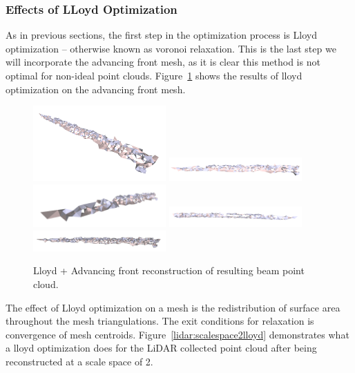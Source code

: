 \documentclass[12pt]{drexelthesis}
\let\Oldsubsubsection\subsubsection
\renewcommand{\subsubsection}{\FloatBarrier\Oldsubsubsection}
\begin{document}
\subsubsection{Effects of LLoyd Optimization}

As in previous sections, the first step in the optimization process is Lloyd optimization -- otherwise known as voronoi relaxation. This is the last step we will incorporate the advancing front mesh, as it is clear this method is not optimal for non-ideal point clouds. Figure~\ref{lidar:advancefrontlloyd} shows the results of lloyd optimization on the advancing front mesh.

\begin{figure}[!ht]
	\centering
		\includegraphics[width=2in]{real-lab-scans/meshed/optimized/advancedlloyd00.png}
		\includegraphics[width=2in]{real-lab-scans/meshed/optimized/advancedlloyd01.png}
		\includegraphics[width=2in]{real-lab-scans/meshed/optimized/advancedlloyd02.png}
		\includegraphics[width=2in]{real-lab-scans/meshed/optimized/advancedlloyd03.png}
		\includegraphics[width=2in]{real-lab-scans/meshed/optimized/advancedlloyd04.png}
		\caption[Lloyd + Advancing front reconstruction of segmented LiDAR data]{\centering Lloyd + Advancing front reconstruction of resulting beam point cloud.}
	\label{lidar:advancefrontlloyd}
\end{figure}

The effect of Lloyd optimization on a mesh is the redistribution of surface area throughout the mesh triangulations. The exit conditions for relaxation is convergence of mesh centroids. Figure~\ref{lidar:scalespace2lloyd} demonstrates what a lloyd optimization does for the LiDAR collected point cloud after being reconstructed at a scale space of 2.
\end{document}
